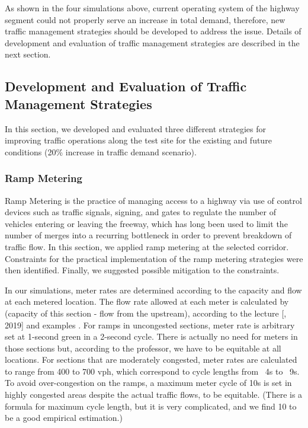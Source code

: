\documentclass{article}
\begin{document}
As shown in the four simulations above, current operating system of the highway segment could not properly serve an increase in total demand, therefore, new traffic management strategies should be developed to address the issue. Details of development and evaluation of traffic management strategies are described in the next section.


\subsection{Development and Evaluation of Traffic Management Strategies}
In this section, we developed and evaluated three different strategies for improving traffic operations along the test site for the existing and future conditions (20\% increase in traffic demand scenario).


\subsubsection{Ramp Metering}
Ramp Metering is the practice of managing access to a highway via use of control devices such as traffic signals, signing, and gates to regulate the number of vehicles entering or leaving the freeway, which has long been used to limit the number of merges into a recurring bottleneck in order to prevent breakdown of traffic flow. In this section, we applied ramp metering at the selected corridor. Constraints for the practical implementation of the ramp metering strategies were then identified. Finally, we suggested possible mitigation to the constraints.

In our simulations, meter rates are determined according to the capacity and flow at each metered location. The flow rate allowed at each meter is calculated by (capacity of this section - flow from the upstream), according to the lecture [\citeauthor{dkan}, 2019] and examples \cite{askabardonis}. For ramps in uncongested sections, meter rate is arbitrary set at 1-second green in a 2-second cycle. There is actually no need for meters in those sections but, according to the professor, we have to be equitable at all locations. For sections that are moderately congested, meter rates are calculated to range from 400 to 700 vph, which correspond to cycle lengths from ~4s to ~9s. To avoid over-congestion on the ramps, a maximum meter cycle of 10s is set in highly congested areas despite the actual traffic flows, to be equitable. (There is a formula for maximum cycle length, but it is very complicated, and we find 10 to be a good empirical estimation.)
\end{document}
